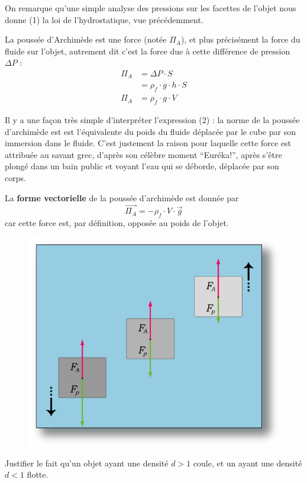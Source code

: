 \documentclass[11pt,a4paper]{article}
\begin{document}
On remarque qu'une simple analyse des pressions sur les facettes de l'objet nous donne (1) la loi de l'hydrostatique, vue précédemment. 

La poussée d'Archimède  est une force (notée $\Pi_A$), et plus précisément la force du fluide sur l'objet, autrement dit c'est la force due à cette différence de pression $\Delta P$ : 
\begin{align*}
    \Pi_A &= \Delta P\cdot S \\
        &= \rho_f\cdot g\cdot h\cdot S \\
     \Pi_A   &= \rho_f\cdot g\cdot V \tag{2}
\end{align*}

Il y a une façon très simple d'interpréter l'expression (2) : la norme de la poussée d'archimède est est l'équivalente du poids du fluide déplacée par le cube par son immersion dans le fluide. C'est justement la raison pour laquelle cette force est attribuée au savant grec, d'après son célèbre moment ``Euréka!'', après s'être plongé dans un bain public et voyant l'eau qui se déborde, déplacée par son corps. 

La \textbf{forme vectorielle} de la poussée d'archimède est donnée par 
\[\overrightarrow{\Pi_A} = - \rho_f\cdot V \cdot \Vec{g} \tag{3} \]
car cette force est, par définition, opposée au poids de l'objet. 

\begin{exo}
\begin{figure}
\centering
\includegraphics[width=0.95\linewidth]{imgs/p9/archimede.png}
\end{figure}
Justifier le fait qu'un objet ayant une densité $d>1$ coule, et un ayant une densité $d<1$ flotte. 
\vspace{5cm}
\end{exo}
\end{document}
